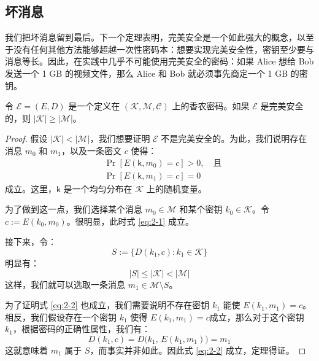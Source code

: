 \subsection{坏消息}

我们把坏消息留到最后。下一个定理表明，完美安全是一个如此强大的概念，以至于没有任何其他方法能够超越一次性密码本：想要实现完美安全性，密钥至少要与消息等长。因此，在实践中几乎不可能使用完美安全的密码：如果 Alice 想给 Bob 发送一个 1 GB 的视频文件，那么 Alice 和 Bob 就必须事先商定一个 1 GB 的密钥。

\begin{theorem}[香农定理]\label{theo:2-5}
令 $\mathcal{E}=(E,D)$ 是一个定义在 $(\mathcal{K},\mathcal{M},\mathcal{C})$ 上的香农密码。如果 $\mathcal{E}$ 是完美安全的，则 $|\mathcal{K}|\geq|\mathcal{M}|$。
\end{theorem}

\begin{proof}
假设 $|\mathcal{K}|<|\mathcal{M}|$，我们想要证明 $\mathcal{E}$ 不是完美安全的。为此，我们说明存在消息 $m_0$ 和 $m_1$，以及一条密文 $c$ 使得：
\begin{align}
& \Pr[E(\mathsf{k},m_0)=c]>0,\quad\text{且} \label{eq:2-1}\\
& \Pr[E(\mathsf{k},m_1)=c]=0 \label{eq:2-2}
\end{align}
成立。这里，$\mathsf{k}$ 是一个均匀分布在 $\mathcal{K}$ 上的随机变量。

为了做到这一点，我们选择某个消息 $m_0\in\mathcal{M}$ 和某个密钥 $k_0\in\mathcal{K}$。令 $c:=E(k_0,m_0)$。很明显，此时式 \ref{eq:2-1} 成立。

接下来，令：
\[
S:=\{D(k_1,c):k_1\in\mathcal{K}\}
\]
明显有：
\[
|S|\leq|\mathcal{K}|<|\mathcal{M}|
\]
这样，我们就可以选取一条消息 $m_1\in \mathcal{M}\setminus S$。

为了证明式 \ref{eq:2-2} 也成立，我们需要说明不存在密钥 $k_1$ 能使 $E(k_1,m_1) = c$。相反，我们假设存在一个密钥 $k_1$ 使得 $E(k_1,m_1) = c$成立，那么对于这个密钥 $k_1$，根据密码的正确性属性，我们有：
\[
D(k_1,c)=D\big(k_1,\,E(k_1,m_1)\big)=m_1
\]
这就意味着 $m_1$ 属于 $S$，而事实并非如此。因此式 \ref{eq:2-2} 成立，定理得证。
\end{proof}